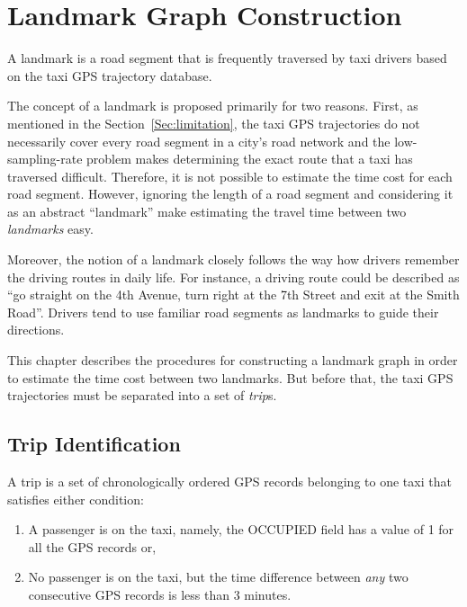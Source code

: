 \chapter{Landmark Graph Construction}
\begin{defn}\label{Def:ldmk}
A landmark is a road segment that is frequently traversed by taxi drivers based on the taxi GPS trajectory database. \cite{TDR10}
\end{defn}
The concept of a landmark is proposed primarily for two reasons. First, as mentioned in the Section~\ref{Sec:limitation}, the taxi GPS trajectories do not necessarily cover every road segment in a city's road network and the low-sampling-rate problem makes determining the exact route that a taxi has traversed difficult. Therefore, it is not possible to estimate the time cost for each road segment. However, ignoring the length of a road segment and considering it as an abstract ``landmark'' make estimating the travel time between two \emph{landmarks} easy. 

Moreover, the notion of a landmark closely follows the way how drivers remember the driving routes in daily life\cite{TDR10}. For instance, a driving route could be described as ``go straight on the 4th Avenue, turn right at the 7th Street and exit at the Smith Road''. Drivers tend to use familiar road segments as landmarks to guide their directions.

This chapter describes the procedures for constructing a landmark graph in order to estimate the time cost between two landmarks. But before that, the taxi GPS trajectories must be separated into a set of \emph{trip}s.

\section{Trip Identification}
\begin{defn}\label{Def:trip}
A trip is a set of chronologically ordered GPS records belonging to one taxi that satisfies either condition:
\begin{enumerate}
\item A passenger is on the taxi, namely, the OCCUPIED field has a value of 1 for all the GPS records or, 
\item No passenger is on the taxi, but the time difference between \emph{any} two consecutive GPS records is less than 3 minutes.
\end{enumerate}
\end{defn}

